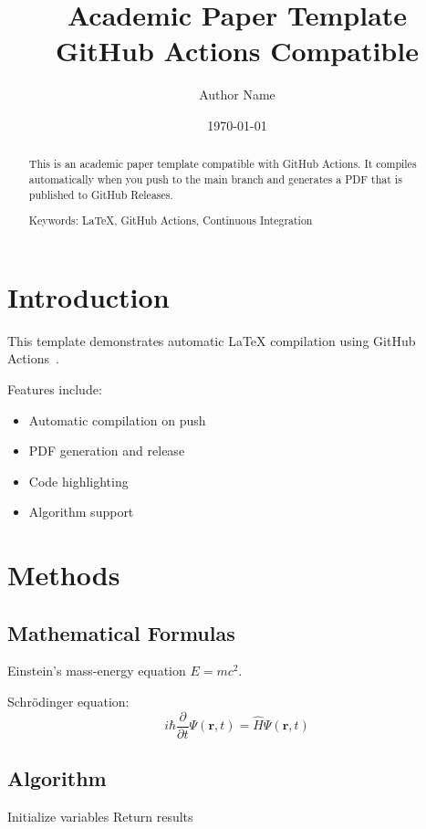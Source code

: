 \documentclass[12pt, a4paper]{article}
\title{Academic Paper Template\\
\large GitHub Actions Compatible}
\author{Author Name}
\date{\today}
\begin{document}
\maketitle

\begin{abstract}
This is an academic paper template compatible with GitHub Actions. It compiles automatically when you push to the main branch and generates a PDF that is published to GitHub Releases.

Keywords: LaTeX, GitHub Actions, Continuous Integration
\end{abstract}

\newpage
\tableofcontents
\newpage

\section{Introduction}

This template demonstrates automatic LaTeX compilation using GitHub Actions~\cite{example2024}.

Features include:
\begin{itemize}
    \item Automatic compilation on push
    \item PDF generation and release
    \item Code highlighting
    \item Algorithm support
\end{itemize}

\section{Methods}

\subsection{Mathematical Formulas}

Einstein's mass-energy equation $E=mc^2$.

Schrödinger equation:
\begin{equation}
    i\hbar\frac{\partial}{\partial t}\Psi(\mathbf{r},t) = \hat{H}\Psi(\mathbf{r},t)
    \label{eq:schrodinger}
\end{equation}

\subsection{Algorithm}

\begin{algorithm}
    \SetAlgoLined
    Initialize variables\;
    Return results\;
    \caption{Example Algorithm}
    \label{algo:example}
\end{algorithm}
\end{document}
